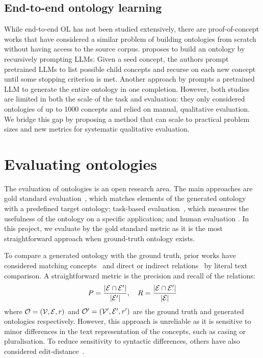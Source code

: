 \subsection{End-to-end ontology learning}

While end-to-end OL has not been studied extensively, there are proof-of-concept works that have considered a similar problem of building ontologies from scratch without having access to the source corpus. \citet{funk2023towards} proposes to build an ontology by recursively prompting LLMs: Given a seed concept, the authors prompt pretrained LLMs to list possible child concepts and recurse on each new concept until some stopping criterion is met. Another approach by \citet{trajanoska2023enhancing} prompts a pretrained LLM to generate the entire ontology in one completion. However, both studies are limited in both the scale of the task and evaluation: they only considered ontologies of up to 1000 concepts and relied on manual, qualitative evaluation. We bridge this gap by proposing a method that can scale to practical problem sizes and new metrics for systematic qualitative evaluation.

\section{Evaluating ontologies}  \label{sec:evaluating-ontologies}

The evaluation of ontologies is an open research area. The main approaches are gold standard evaluation~\cite{Zavitsanos2011GoldSE}, which matches elements of the generated ontology with a predefined target ontology; task-based evaluation~\cite{porzel2004task}, which measures the usefulness of the ontology on a specific application; and human evaluation \cite{raad2015survey,brank2005survey}. In this project, we evaluate by the gold standard metric as it is the most straightforward approach when ground-truth ontology exists.

To compare a generated ontology with the ground truth, prior works have considered matching concepts~\cite{maedche2002measuring} and direct or indirect relations~\cite{Kashyap2005TaxaMinerAE} by literal text comparison. A straightforward metric is the precision and recall of the relations:
\[
    P = \frac{|\mathcal{E} \cap \mathcal{E}'|}{|\mathcal{E}'|}, \quad R = \frac{|\mathcal{E} \cap \mathcal{E}'|}{|\mathcal{E}|}
\]
where $\mathcal{O} = (\mathcal{V}, \mathcal{E}, r)$ and $\mathcal{O}' = (\mathcal{V}', \mathcal{E}', r')$ are the ground truth and generated ontologies respectively. However, this approach is unreliable as it is sensitive to minor differences in the text representation of the concepts, such as casing or pluralisation. To reduce sensitivity to syntactic differences, others have also considered edit-distance~\cite{Ehrig2005SimilarityFO}.

